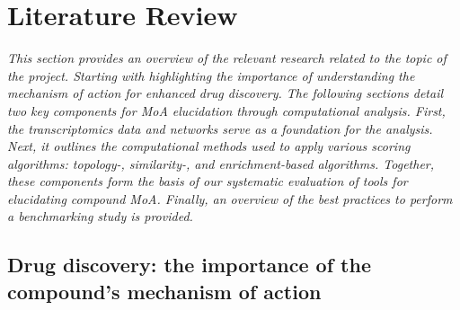 
%

\chapter{Literature Review}
\label{cha:literature_review}

\textit{This section provides an overview of the relevant research related to the topic of the project. Starting with highlighting the importance of understanding the mechanism of action for enhanced drug discovery. The following sections detail two key components for MoA elucidation through computational analysis. First, the transcriptomics data and networks serve as a foundation for the analysis. Next, it outlines the computational methods used to apply various scoring algorithms: topology-, similarity-, and enrichment-based algorithms. Together, these components form the basis of our systematic evaluation of tools for elucidating compound MoA. Finally, an overview of the best practices to perform a benchmarking study is provided.}

\section{Drug discovery: the importance of the compound’s mechanism of action} %
\label{sec:drug_discovery:_the_importance_of_the_compound’s_mechanism_of_action}

\cite{viper}

